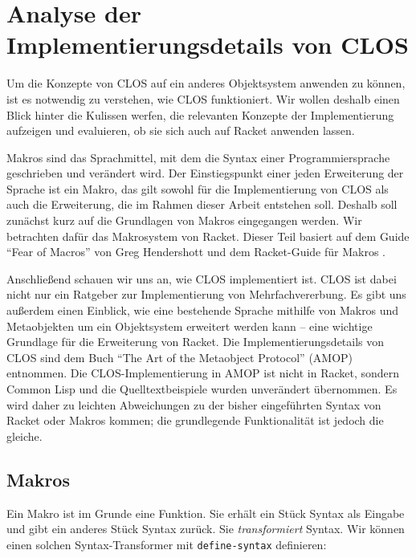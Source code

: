 \chapter{Analyse der Implementierungsdetails von CLOS}
Um die Konzepte von CLOS auf ein anderes Objektsystem anwenden zu können, ist es notwendig zu verstehen, wie CLOS funktioniert. Wir wollen deshalb einen Blick hinter die Kulissen werfen, die relevanten Konzepte der Implementierung aufzeigen und evaluieren, ob sie sich auch auf Racket anwenden lassen.

Makros sind das Sprachmittel, mit dem die Syntax einer Programmiersprache geschrieben und verändert wird. Der Einstiegspunkt einer jeden Erweiterung der Sprache ist ein Makro, das gilt sowohl für die Implementierung von CLOS als auch die Erweiterung, die im Rahmen dieser Arbeit entstehen soll. Deshalb soll zunächst kurz auf die Grundlagen von Makros eingegangen werden. Wir betrachten dafür das Makrosystem von Racket. Dieser Teil basiert auf dem Guide ``Fear of Macros'' von Greg Hendershott \cite{fearofmacros} und dem Racket-Guide für Makros \cite{racketguide-macros}.

Anschließend schauen wir uns an, wie CLOS implementiert ist. CLOS ist dabei nicht nur ein Ratgeber zur Implementierung von Mehrfachvererbung. Es gibt uns außerdem einen Einblick, wie eine bestehende Sprache mithilfe von Makros und Metaobjekten um ein Objektsystem erweitert werden kann -- eine wichtige Grundlage für die Erweiterung von Racket. Die Implementierungsdetails von CLOS sind dem Buch ``The Art of the Metaobject Protocol'' (AMOP) \cite{amop} entnommen. Die CLOS-Implementierung in AMOP ist nicht in Racket, sondern Common Lisp und die Quelltextbeispiele wurden unverändert übernommen. Es wird daher zu leichten Abweichungen zu der bisher eingeführten Syntax von Racket oder Makros kommen; die grundlegende Funktionalität ist jedoch die gleiche.

\section{Makros} 
\label{makros}

Ein Makro ist im Grunde eine Funktion. Sie erhält ein Stück Syntax als Eingabe und gibt ein anderes Stück Syntax zurück. Sie \textit{transformiert} Syntax. Wir können einen solchen Syntax-Transformer mit \texttt{define-syntax} definieren:

